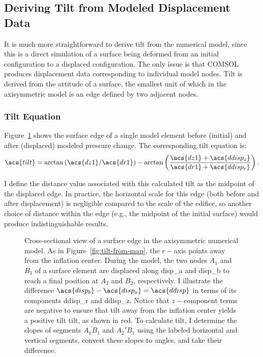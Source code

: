 \subsection{Deriving Tilt from Modeled Displacement Data}\label{sec:tilt-from-model}

It is much more straightforward to derive tilt from the numerical model, since this is a direct simulation of a surface being deformed from an initial configuration to a displaced configuration. The only issue is that COMSOL produces displacement data corresponding to individual model nodes. Tilt is derived from the attitude of a surface, the smallest unit of which in the axisymmetric model is an edge defined by two adjacent nodes.

\subsubsection{Tilt Equation}
Figure~\ref{fig:tilt-from-model} shows the surface edge of a single model element before (initial) and after (displaced) modeled pressure change. The corresponding tilt equation is:
\begin{equation}
    \acs{tilt} = \arctan\left({\acs{dz1}}/{\acs{dr1}}\right) - \arctan\left(\dfrac{\acs{dz1}+\acs{ddisp_z}}{\acs{dr1}+\acs{ddisp_r}}\right).\label{eq:tilt-from-model}
\end{equation}

I define the distance value associated with this calculated tilt as the midpoint of the displaced edge. In practice, the horizontal scale for this edge (both before and after displacement) is negligible compared to the scale of the edifice, so another choice of distance within the edge (e.g., the midpoint of the initial surface) would produce indistinguishable results.

\begin{figure}
    \caption[Tilt from numerical modeling]{Cross-sectional view of a surface edge in the axisymmetric numerical model. As in Figure~\ref{fig:tilt-from-map}, the $r-$axis points away from the inflation center. During the model, the two nodes $A_1$ and $B_1$ of a surface element are displaced along \acs{disp_a} and \acs{disp_b} to reach a final position at $A_2$ and $B_2$, respectively. I illustrate the difference $\acs{disp_b} - \acs{disp_a} = \acs{ddisp}$ in terms of its components \acs{ddisp_r} and \acs{ddisp_z}. Notice that $z-$component terms are negative to ensure that tilt away from the inflation center yields a positive tilt \acs{tilt}, as shown in red. To calculate \acs{tilt}, I determine the slopes of segments $\overline{A_1B_1}$ and $\overline{A_2'B_1}$ using the labeled horizontal and vertical segments, convert these slopes to angles, and take their difference.}%
    \label{fig:tilt-from-model}%
\end{figure}

